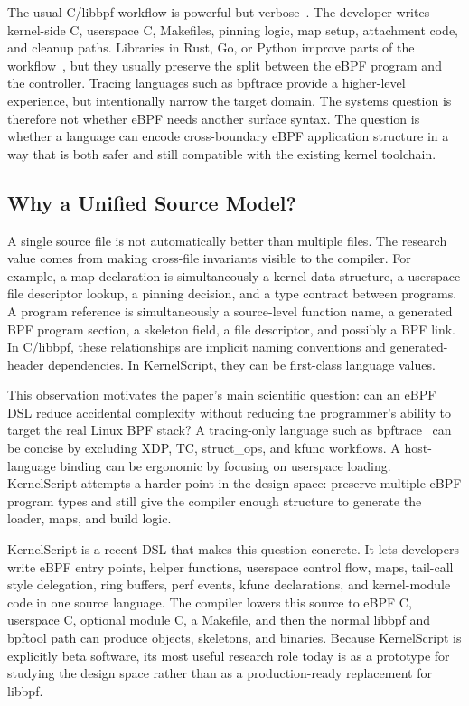 \documentclass[10pt,twocolumn]{article}
\newcommand{\tool}{KernelScript}
\begin{document}
The usual C/libbpf workflow is powerful but verbose~\cite{libbpf}.  The developer writes
kernel-side C, userspace C, Makefiles, pinning logic, map setup, attachment
code, and cleanup paths.  Libraries in Rust, Go, or Python improve parts of the
workflow~\cite{aya,cilium-ebpf}, but they usually preserve the split between the eBPF program and the
controller.  Tracing languages such as bpftrace provide a higher-level
experience, but intentionally narrow the target domain.  The systems question
is therefore not whether eBPF needs another surface syntax.  The question is
whether a language can encode cross-boundary eBPF application structure in a
way that is both safer and still compatible with the existing kernel toolchain.

\subsection{Why a Unified Source Model?}

A single source file is not automatically better than multiple files.  The
research value comes from making cross-file invariants visible to the compiler.
For example, a map declaration is simultaneously a kernel data structure, a
userspace file descriptor lookup, a pinning decision, and a type contract
between programs.  A program reference is simultaneously a source-level
function name, a generated BPF program section, a skeleton field, a file
descriptor, and possibly a BPF link.  In C/libbpf, these relationships are
implicit naming conventions and generated-header dependencies.  In \tool{},
they can be first-class language values.

This observation motivates the paper's main scientific question: can an eBPF
DSL reduce accidental complexity without reducing the programmer's ability to
target the real Linux BPF stack?  A tracing-only language such as
bpftrace~\cite{bpftrace} can be concise by excluding XDP, TC, struct\_ops, and
kfunc workflows.  A host-language binding can be ergonomic by focusing on
userspace loading.  \tool{} attempts a harder point in the design space:
preserve multiple eBPF program types and still give the compiler enough
structure to generate the loader, maps, and build logic.

\tool{} is a recent DSL that makes this question concrete.  It lets developers
write eBPF entry points, helper functions, userspace control flow, maps,
tail-call style delegation, ring buffers, perf events, kfunc declarations, and
kernel-module code in one source language.  The compiler lowers this source to
eBPF C, userspace C, optional module C, a Makefile, and then the normal libbpf
and bpftool path can produce objects, skeletons, and binaries.  Because
\tool{} is explicitly beta software, its most useful research role today is as
a prototype for studying the design space rather than as a production-ready
replacement for libbpf.
\end{document}
